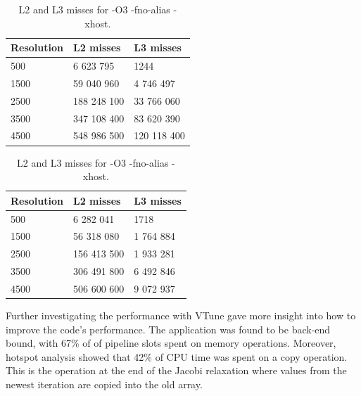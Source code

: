 \begin{table}[h]
\parbox{.45\linewidth}{
\caption{L2 and L3 misses for -O2.}
\label{tab:profiling-O2}
\begin{tabular}{|lll|}
\hline
\multicolumn{1}{|l|}{Resolution} & \multicolumn{1}{l|}{L2 misses} & L3 misses \\ \hline
\multicolumn{1}{|l|}{500}        & \multicolumn{1}{l|}{6 623 795}   & 1244             \\ \hline
\multicolumn{1}{|l|}{1500}       & \multicolumn{1}{l|}{59 040 960}  & 4 746 497             \\ \hline
\multicolumn{1}{|l|}{2500}       & \multicolumn{1}{l|}{188 248 100} & 33 766 060             \\ \hline
\multicolumn{1}{|l|}{3500}       & \multicolumn{1}{l|}{347 108 400} & 83 620 390             \\ \hline
\multicolumn{1}{|l|}{4500}       & \multicolumn{1}{l|}{548 986 500} & 120 118 400             \\ \hline
\end{tabular}
}
\hfill
\parbox{.45\linewidth}{
        \caption{L2 and L3 misses for -O3 -fno-alias -xhost.}
\label{tab:profiling-O3}
\begin{tabular}{|lll|}
\hline
\multicolumn{1}{|l|}{Resolution} & \multicolumn{1}{l|}{L2 misses} & L3 misses       \\ \hline
\multicolumn{1}{|l|}{500}        & \multicolumn{1}{l|}{6 282 041}   & 1718             \\ \hline
\multicolumn{1}{|l|}{1500}       & \multicolumn{1}{l|}{56 318 080}  & 1 764 884             \\ \hline
\multicolumn{1}{|l|}{2500}       & \multicolumn{1}{l|}{156 413 500} & 1 933 281            \\ \hline
\multicolumn{1}{|l|}{3500}       & \multicolumn{1}{l|}{306 491 800} & 6 492 846              \\ \hline
\multicolumn{1}{|l|}{4500}       & \multicolumn{1}{l|}{506 600 600} & 9 072 937             \\ \hline
\end{tabular}
    }
\end{table}

Further investigating the performance with VTune gave more insight into how to improve the code's performance. The application was found to be back-end bound, with 67\% of of pipeline slots spent on memory operations. Moreover, hotspot analysis showed that 42\% of CPU time was spent on a copy operation. This is the operation at the end of the Jacobi relaxation where values from the newest iteration are copied into the old array. 

